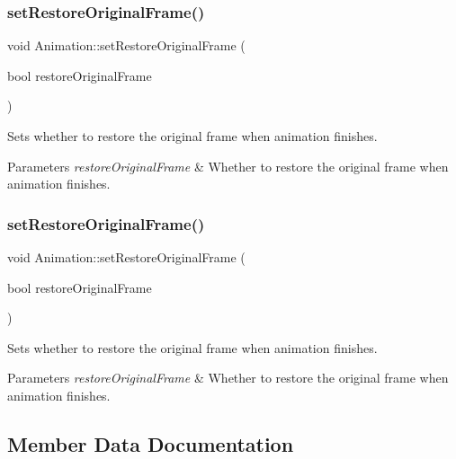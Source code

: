 \subsubsection{\texorpdfstring{set\+Restore\+Original\+Frame()}{setRestoreOriginalFrame()}\hspace{0.1cm}{\footnotesize\ttfamily [1/2]}}
{\footnotesize\ttfamily void Animation\+::set\+Restore\+Original\+Frame (\begin{DoxyParamCaption}\item[{bool}]{restore\+Original\+Frame }\end{DoxyParamCaption})\hspace{0.3cm}{\ttfamily [inline]}}

Sets whether to restore the original frame when animation finishes.


\begin{DoxyParams}{Parameters}
{\em restore\+Original\+Frame} & Whether to restore the original frame when animation finishes. \\
\hline
\end{DoxyParams}
\mbox{\label{classAnimation_aeee2ac2f17c63415f5b34c9546824cde}} 
\subsubsection{\texorpdfstring{set\+Restore\+Original\+Frame()}{setRestoreOriginalFrame()}\hspace{0.1cm}{\footnotesize\ttfamily [2/2]}}
{\footnotesize\ttfamily void Animation\+::set\+Restore\+Original\+Frame (\begin{DoxyParamCaption}\item[{bool}]{restore\+Original\+Frame }\end{DoxyParamCaption})\hspace{0.3cm}{\ttfamily [inline]}}

Sets whether to restore the original frame when animation finishes.


\begin{DoxyParams}{Parameters}
{\em restore\+Original\+Frame} & Whether to restore the original frame when animation finishes. \\
\hline
\end{DoxyParams}


\subsection{Member Data Documentation}
\mbox{\label{classAnimation_abb0374240f4f6c443aed804dca1e0a7a}} 

